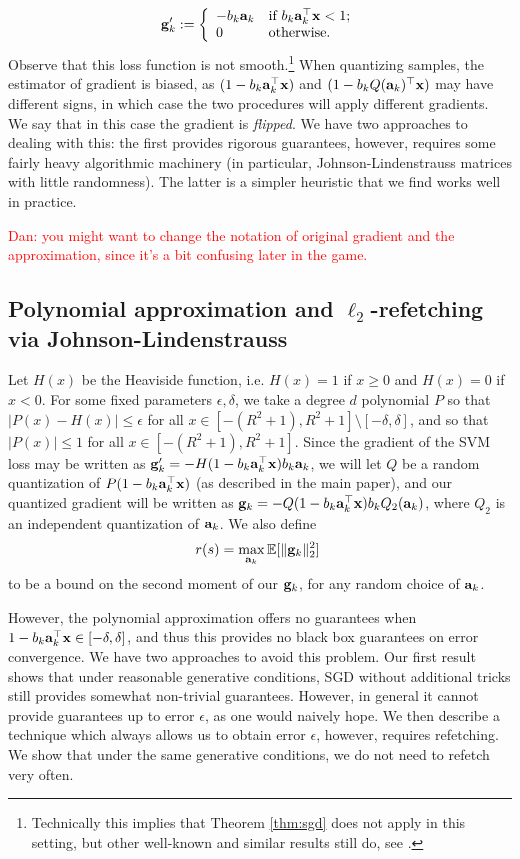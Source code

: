 \documentclass{article}
\def\a{{\bf a}}
\def\g{{\bf g}}
\def\x{{\bf x}}
\def\E{\mathbb{E}}
\begin{document}
\[
\g'_k := \left\{ \begin{array}{ll}
         -b_k \a_k & \mbox{if $b_k \a_k^\top \x < 1$};\\
         0 & \mbox{otherwise}. \end{array} \right.
\]
Observe that this loss function is not smooth.\footnote{Technically this implies that Theorem \ref{thm:sgd} does not apply in this setting, but other well-known and similar results still do, see \cite{2014arXiv1405.4980B}.}
When quantizing samples, the estimator of gradient is biased, as $(1 - b_k \a_k^\top \x)$ and $(1 - b_k Q(\a_k)^\top \x)$ may have different signs, in which case the two procedures will apply different gradients. We say that in this case the gradient is \emph{flipped}. 
We have two approaches to dealing with this: the first provides rigorous guarantees, however, requires some fairly heavy algorithmic machinery (in particular, Johnson-Lindenstrauss matrices with little randomness).
The latter is a simpler heuristic that we find works well in practice.

\textcolor{red}{Dan: you might want to change the notation of original gradient and the approximation, since it's a bit confusing later in the game.}

\subsection{Polynomial approximation and $\ell_2$-refetching via Johnson-Lindenstrauss}
Let $H(x)$ be the Heaviside function, i.e. $H(x) = 1$ if $x \geq 0$ and $H(x) = 0$ if $x < 0$. 
For some fixed parameters $\epsilon, \delta$, we take a degree $d$ polynomial $P$ so that $| P(x) - H(x) | \leq \epsilon$ for all $x \in [-(R^2 + 1), R^2 + 1] \setminus [-\delta, \delta]$, and so that $|P(x)| \leq 1$ for all $x \in  [-(R^2 + 1), R^2 + 1]$.
Since the gradient of the SVM loss may be written as $\g'_k = -H(1 - b_k \a_k^\top \x) b_k \a_k$, we will let $Q$ be a random quantization of $P(1 - b_k \a_k^\top \x)$ (as described in the main paper), and our quantized gradient will be written as $\g_k = -Q(1 - b_k \a_k^\top \x) b_k Q_2 (\a_k)$, where $Q_2$ is an independent quantization of $\a_k$.
We also define
\[
r(s) = \max_{\a_k} \E [\| \g_k \|_2^2] \; 
\]
to be a bound on the second moment of our $\g_k$, for any random choice of $\a_k$.

However, the polynomial approximation offers no guarantees when $1 - b_k \a_k^\top \x \in [-\delta, \delta]$, and thus this provides no black box guarantees on error convergence.
We have two approaches to avoid this problem.
Our first result shows that under reasonable generative conditions, SGD without additional tricks still provides somewhat non-trivial guarantees. However, in general it cannot provide guarantees up to error $\epsilon$, as one would naively hope.
We then describe a technique which always allows us to obtain error $\epsilon$, however, requires refetching.
We show that under the same generative conditions, we do not need to refetch very often.
\end{document}
